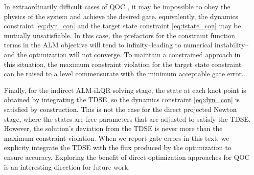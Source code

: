 In extraordinarily difficult cases of
QOC \cite{abdelhafez2020universal}, it may be impossible
to obey the physics of the system and achieve the desired gate,
equivalently, the dynamics constraint \eqref{eq:dyn_con}
and the target state constraint \eqref{eq:tstate_con} may be mutually unsatisfiable.
In this case, the prefactors for the constraint function terms
in the ALM objective will tend to infinity--leading to numerical instability--and the
optimization will not converge. To maintain a constrained approach in this situation,
the maximum constraint violation for the target state constraint can be raised
to a level commensurate with the minimum acceptable gate error.

Finally, for the indirect ALM-iLQR solving stage,
the state at each knot point is obtained by integrating
the TDSE, so the dynamics constraint \eqref{eq:dyn_con} is satisfied by construction.
This is not the case for the direct projected Newton stage, where the states
are free parameters that are adjusted to satisfy the TDSE. However,
the solution's deviation from the TDSE is never more than the maximum constraint violation.
When we report gate errors in this text, we explicity integrate the TDSE with the
flux produced by the optimization to ensure accuracy. Exploring the benefit
of direct optimization approaches for QOC is an interesting direction for future work.

